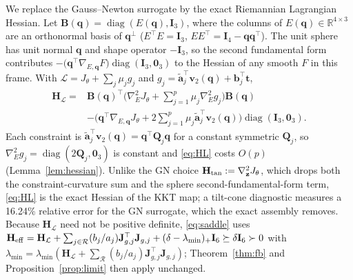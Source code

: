 We replace the Gauss--Newton surrogate by the exact Riemannian Lagrangian Hessian. Let $\mathbf B(\mathbf q)=\operatorname{diag}(E(\mathbf q),\mathbf I_3)$, where the columns of $E(\mathbf q)\in\mathbb{R}^{4\times3}$ are an orthonormal basis of $\mathbf q^\perp$ ($E^\top E=\mathbf I_3$, $EE^\top=\mathbf I_4-\mathbf q\mathbf q^\top$). The unit sphere has unit normal $\mathbf q$ and shape operator $-\mathbf I_3$, so the second fundamental form contributes $-\big(\mathbf q^\top\nabla_{E,\mathbf q}F\big)\operatorname{diag}(\mathbf I_3,\mathbf 0_3)$ to the Hessian of any smooth $F$ in this frame. With $\mathcal L=J_\theta+\sum_j\mu_jg_j$ and $g_j=\tilde{\mathbf a}_j^\top\mathbf v_2(\mathbf q)+\mathbf b_j^\top\mathbf t$,
\begin{equation}
\begin{aligned}
\mathbf H_{\mathcal L}={}&\mathbf B(\mathbf q)^\top\Big(\nabla_E^2J_\theta+\sum_{j=1}^p\mu_j\nabla_E^2g_j\Big)\mathbf B(\mathbf q)\\
&-\Big(\mathbf q^\top\nabla_{E,\mathbf q}J_\theta+2\sum_{j=1}^p\mu_j\tilde{\mathbf a}_j^\top\mathbf v_2(\mathbf q)\Big)\operatorname{diag}(\mathbf I_3,\mathbf 0_3).
\end{aligned}
\label{eq:HL}
\end{equation}
Each constraint is $\tilde{\mathbf a}_j^\top\mathbf v_2(\mathbf q)=\mathbf q^\top\mathbf Q_j\mathbf q$ for a constant symmetric $\mathbf Q_j$, so $\nabla_E^2g_j=\operatorname{diag}(2\mathbf Q_j,\mathbf 0_3)$ is constant and \eqref{eq:HL} costs $O(p)$ (Lemma~\ref{lem:hessian}). Unlike the GN choice $\mathbf H_{\rm tan}:=\nabla^2_{\mathbf z}J_\theta$, which drops both the constraint-curvature sum and the sphere second-fundamental-form term, \eqref{eq:HL} is the exact Hessian of the KKT map; a tilt-cone diagnostic measures a 16.24\% relative error for the GN surrogate, which the exact assembly removes. Because $\mathbf H_{\mathcal L}$ need not be positive definite, \eqref{eq:saddle} uses $\mathbf H_{\rm eff}=\mathbf H_{\mathcal L}+\sum_{j\in\mathcal R}(b_j/a_j)\mathbf J_{g,j}^\top\mathbf J_{g,j}+(\delta-\lambda_{\min})_+\mathbf I_6\succeq\delta\mathbf I_6\succ0$ with $\lambda_{\min}=\lambda_{\min}(\mathbf H_{\mathcal L}+\sum_{\mathcal R}(b_j/a_j)\mathbf J_{g,j}^\top\mathbf J_{g,j})$; Theorem~\ref{thm:fb} and Proposition~\ref{prop:limit} then apply unchanged.

